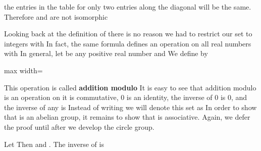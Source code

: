 \documentclass[11pt,oneside]{article}
\begin{document}
\BookNarrativetrue

\begin{BookBody}

\noindent the entries in the table for  only two entries along the diagonal will be the same. Therefore  and  are not isomorphic\BookEnd{\blacktriangle}

Looking back at the definition of  there is no reason we had to restrict our set to integers  with  In fact, the same formula defines an operation on all real numbers  with  In general, let  be any positive real number and \BookInline{a,\allowbreak b\in [0,\allowbreak c).} We define  by

\begin{center}\begin{adjustbox}{max width=\linewidth}\end{adjustbox}\end{center}

\noindent This operation is called\textbf{ addition modulo}  It is easy to see that addition modulo  is an operation on \BookInline{[0,\allowbreak c),\allowbreak } it is commutative, 0 is an identity, the inverse of 0 is 0, and the inverse of any  is  Instead of writing \BookInline{[0,\allowbreak c)} we will denote this set as  In order to show that  is an abelian group, it remains to show that  is associative. Again, we defer the proof until after we develop the circle group.

 Let  Then  and . The inverse of  is \BookInline{2\pi - }  \BookEnd{\blacktriangle}


\end{BookBody}
\end{document}

